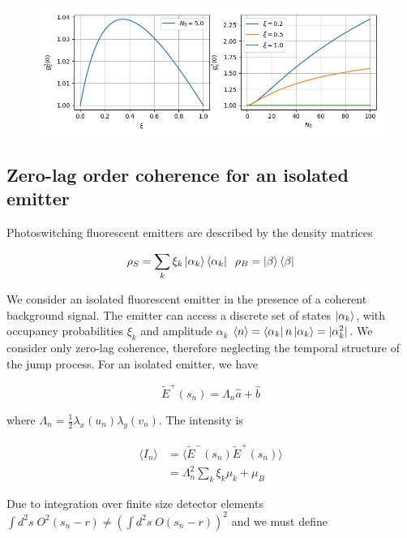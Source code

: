 \documentclass[a4paper, twocolumn, superscriptaddress,prl]{revtex4}  %
\begin{document}
\onecolumngrid

\begin{figure}[h] 
\includegraphics[width=16cm]{Figure_1.png}
\end{figure}    
\twocolumngrid

\subsection{Zero-lag order coherence for an isolated emitter}

Photoswitching fluorescent emitters are described by the density matrices

\begin{equation*}
\rho_{S} = \sum_{k}\xi_{k}\ket{\alpha_k}\bra{\alpha_k}\;\;\rho_{B} = \ket{\beta}\bra{\beta}
\end{equation*}

We consider an isolated fluorescent emitter in the presence of a coherent background signal. The emitter can access a discrete set of states $\ket{\alpha_k}$, with occupancy probabilities $\xi_{k}$ and amplitude $\alpha_k$  $\langle n\rangle = \bra{\alpha_{k}} n\ket{\alpha_{k}} = \lvert\alpha_{k}^{2}\rvert$. We consider only zero-lag coherence, therefore neglecting the temporal structure of the jump process. For an isolated emitter, we have

\begin{equation}
\tilde{E}^{+}(s_{n}) =  \Lambda_{n}\hat{a} + \hat{b}
\end{equation}

where $\Lambda_{n} = \frac{1}{2}\lambda_{x}(u_n) \lambda_{y}(v_n)$. The intensity is

\begin{align}
\langle I_{n} \rangle &= \langle \tilde{E}^{-}(s_n)\tilde{E}^{+}(s_n)\rangle \\
&= \Lambda_{n}^{2}\sum_{k}\xi_{k}\mu_{k} + \mu_{B}
\end{align}

Due to integration over finite size detector elements $\int d^{2}s \; O^2(s_n-r) \neq \left(\int d^{2}s \; O(s_n-r)\right)^2$ and we must define 
\end{document}
